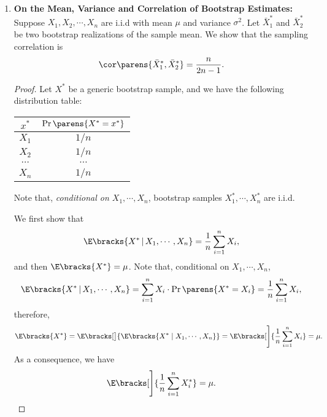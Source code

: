 \documentclass[12pt]{article}
\begin{document}
\begin{enumerate}[label=\textbf{\arabic*.}]
	\item \textbf{On the Mean, Variance and Correlation of Bootstrap Estimates:} Suppose $X_1, X_2, \cdots, X_n$ are i.i.d with mean $\mu$ and variance $\sigma^2$. Let $\bar{X}_1^*$ and $\bar{X}_2^*$ be two bootstrap realizations of the sample mean. We show that the sampling correlation is 
	\begin{align*}
		\cor \parens{\bar{X}^*_1, \bar{X}^*_2} = \frac{n}{2n-1}. 
	\end{align*}
	
	\begin{proof}
	Let $X^*$ be a generic bootstrap sample, and we have the following distribution table: 
	\begin{table}[h]
	\centering
		\begin{tabular}{cc}
		\toprule
		$x^*$      & $\Pr \parens{X^* = x^*}$ \\
		\midrule
		$X_1$      & $1/n$                    \\
		$X_2$      & $1/n$                    \\
		$\cdots$   & $\cdots$                 \\
		$X_n$      & $1/n$                    \\
		\bottomrule
		\end{tabular}
	\end{table}
	
	Note that, \emph{conditional on $X_1, \cdots, X_n$}, bootstrap samples $X_1^*, \cdots, X_n^*$ are i.i.d. 
	
	We first show that 
	\begin{align*}
		\E \bracks{X^* \,\vert\, X_1, \cdots, X_n} = \frac{1}{n} \sum_{i=1}^n X_i, 
	\end{align*}
	and then $\E \bracks{X^*} = \mu$. Note that, conditional on $X_1, \cdots, X_n$, 
	\begin{align*}
		\E \bracks{X^* \,\vert\, X_1, \cdots, X_n} = \sum_{i=1}^n X_i \cdot \Pr \parens{X^* = X_i} = \frac{1}{n} \sum_{i=1}^n X_i, 
	\end{align*}
	therefore, 
	\begin{align*}
		\E \bracks{X^*} = \E \bracks[\big]{\E \bracks{X^* \mid X_1, \cdots, X_n}} = \E \bracks[\Bigg]{\frac{1}{n} \sum_{i=1}^n X_i} = \mu. 
	\end{align*}
	As a consequence, we have 
	\begin{align*}
		\E \bracks[\Bigg]{\frac{1}{n} \sum_{i=1}^n X_i^*} = \mu. 
	\end{align*}
	

\end{proof}
\end{enumerate}
\end{document}
